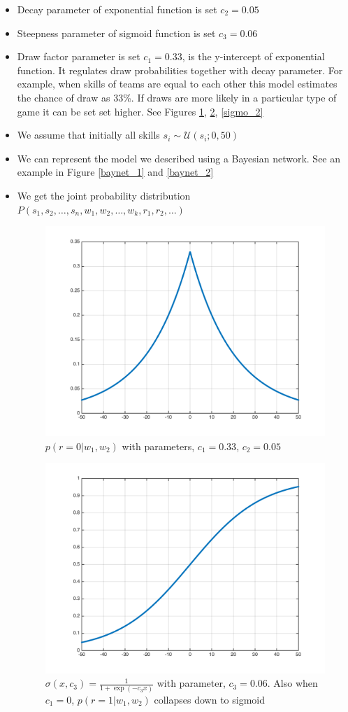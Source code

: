 \documentclass[12pt]{article}
\begin{document}
\begin{itemize}
	\item Decay parameter of exponential function is set $c_2 = 0.05$
	\item Steepness parameter of sigmoid function is set $c_3 = 0.06$ 
	\item Draw factor parameter is set $c_1 = 0.33$, is the y-intercept of exponential function. It regulates draw probabilities together with decay parameter. For example, when skills of teams are equal to each other this model estimates the chance of draw as 33\%. If draws are more likely in a particular type of game it can be set set higher. See Figures \ref{bi_exp}, \ref{sigmo}, \ref{sigmo_2}
	\item We assume that initially all skills $s_i \sim \mathcal{U}(s_i;0,50)$
	\item We can represent the model we described using a Bayesian network. See an example in Figure \ref{baynet_1} and \ref{baynet_2}
	\item We get the joint probability distribution $P(s_1, s_2, \dots, s_n, w_1, w_2, \dots, w_k, r_1, r_2, \dots)$
	
	
	\begin{figure}[!ht]
		\centering
		\includegraphics[width=0.7\columnwidth]{bi_expo}
		\caption{$p(r = 0 | w_1, w_2)$ with parameters, $c_1 = 0.33$, $c_2 = 0.05$}
		\label{bi_exp}
	\end{figure}
	
	\begin{figure}[!ht]
		\centering
		\includegraphics[width=0.9\columnwidth]{sigmo}
		\caption{$\sigma(x, c_3) = \frac{1}{1+ \exp(-c_3 x)}$ with parameter, $c_3 = 0.06$. Also when $c_1 = 0$, $p(r = 1 | w_1, w_2)$ collapses down to sigmoid}
		\label{sigmo}
	\end{figure}


\end{itemize}
\end{document}
